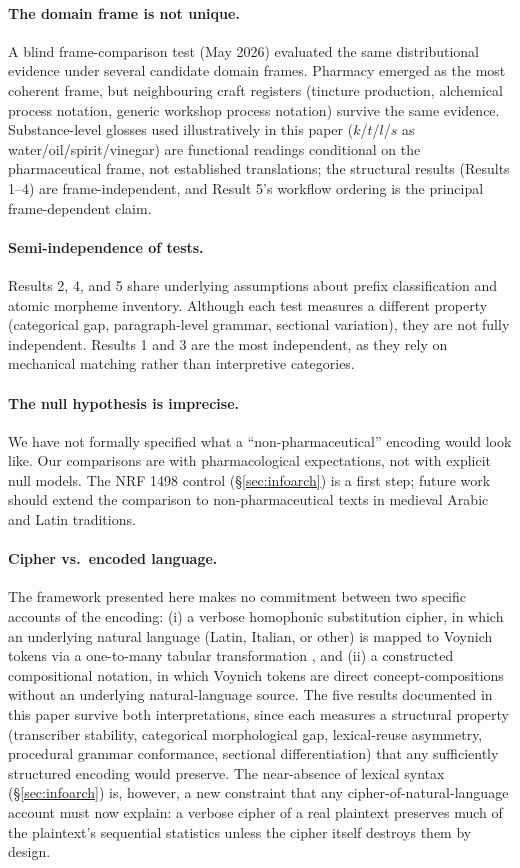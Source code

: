 \documentclass[11pt,a4paper]{article}
\begin{document}
\paragraph{The domain frame is not unique.} A blind frame-comparison test (May 2026) evaluated the same distributional evidence under several candidate domain frames. Pharmacy emerged as the most coherent frame, but neighbouring craft registers (tincture production, alchemical process notation, generic workshop process notation) survive the same evidence. Substance-level glosses used illustratively in this paper ($k$/$t$/$l$/$s$ as water/oil/spirit/vinegar) are functional readings conditional on the pharmaceutical frame, not established translations; the structural results (Results 1--4) are frame-independent, and Result 5's workflow ordering is the principal frame-dependent claim.

\paragraph{Semi-independence of tests.} Results 2, 4, and 5 share underlying assumptions about prefix classification and atomic morpheme inventory. Although each test measures a different property (categorical gap, paragraph-level grammar, sectional variation), they are not fully independent. Results 1 and 3 are the most independent, as they rely on mechanical matching rather than interpretive categories.

\paragraph{The null hypothesis is imprecise.} We have not formally specified what a ``non-pharmaceutical'' encoding would look like. Our comparisons are with pharmacological expectations, not with explicit null models. The NRF 1498 control (\S\ref{sec:infoarch}) is a first step; future work should extend the comparison to non-pharmaceutical texts in medieval Arabic and Latin traditions.

\paragraph{Cipher vs.\ encoded language.} The framework presented here makes no commitment between two specific accounts of the encoding: (i) a verbose homophonic substitution cipher, in which an underlying natural language (Latin, Italian, or other) is mapped to Voynich tokens via a one-to-many tabular transformation \citep{Greshko2025}, and (ii) a constructed compositional notation, in which Voynich tokens are direct concept-compositions without an underlying natural-language source. The five results documented in this paper survive both interpretations, since each measures a structural property (transcriber stability, categorical morphological gap, lexical-reuse asymmetry, procedural grammar conformance, sectional differentiation) that any sufficiently structured encoding would preserve. The near-absence of lexical syntax (\S\ref{sec:infoarch}) is, however, a new constraint that any cipher-of-natural-language account must now explain: a verbose cipher of a real plaintext preserves much of the plaintext's sequential statistics unless the cipher itself destroys them by design.
\end{document}
